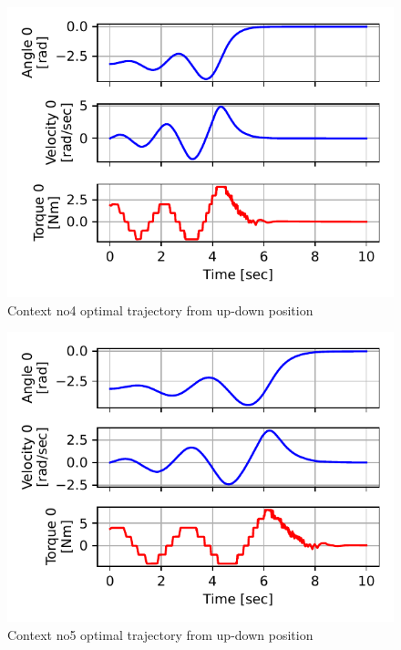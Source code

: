 \newpage
\begin{figure}[p]
\begin{center}
\includegraphics[width=0.99\linewidth]{fig/c4_traj.pdf}
\caption{Context no4 optimal trajectory from up-down position}\label{fig:c4_traj}
\end{center}
\end{figure}


\begin{figure}[p]
\begin{center}
\includegraphics[width=0.99\linewidth]{fig/c5_traj.pdf}
\caption{Context no5 optimal trajectory from up-down position}\label{fig:c5_traj}
\end{center}
\end{figure}

